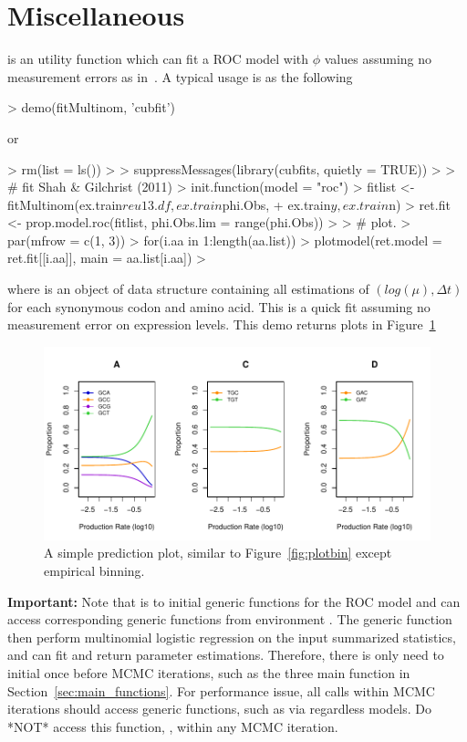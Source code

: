
\section[Miscellaneous]{Miscellaneous}
\label{sec:misc}

 is an utility function which can fit a ROC model with
$\phi$ values assuming no measurement errors as in~\cite{Shah2011}.
A typical usage is as the following
\begin{Code}
> demo(fitMultinom, 'cubfit')
\end{Code}
or
\begin{Code}
> rm(list = ls())
>
> suppressMessages(library(cubfits, quietly = TRUE))
>
> # fit Shah & Gilchrist (2011)
> init.function(model = "roc")
> fitlist <- fitMultinom(ex.train$reu13.df, ex.train$phi.Obs,
+                        ex.train$y, ex.train$n)
> ret.fit <- prop.model.roc(fitlist, phi.Obs.lim = range(phi.Obs))
>
> # plot.
> par(mfrow = c(1, 3))
> for(i.aa in 1:length(aa.list)){
>   plotmodel(ret.model = ret.fit[[i.aa]], main = aa.list[i.aa])
> }
\end{Code}
where  is an object of  data structure containing
all estimations of $(log(\mu), \Delta t)$ for each synonymous codon and
amino acid.
This is a quick fit assuming no measurement error on expression levels.
This demo returns plots in Figure~\ref{fig:fitMultinom}
\begin{figure}[ht]
\centering
\includegraphics[width=6in]{cubfits-include/figure/fitMultinom}
\caption{A simple prediction plot, similar to Figure~\ref{fig:plotbin}
except empirical binning.
}
\label{fig:fitMultinom}
\end{figure}

{\color{red} \bf Important:}
Note that  is to initial generic functions
for the ROC model and  can access corresponding generic
functions from environment . The generic function then
perform multinomial logistic regression on the input summarized statistics,
and  can fit and return parameter estimations.
Therefore, there is only need to initial once before MCMC iterations, such as
the three main function in Section~\ref{sec:main_functions}. For performance
issue, all calls within MCMC iterations should access generic functions, such
as via  regardless models. Do *NOT*
access this function, , within any MCMC iteration.

